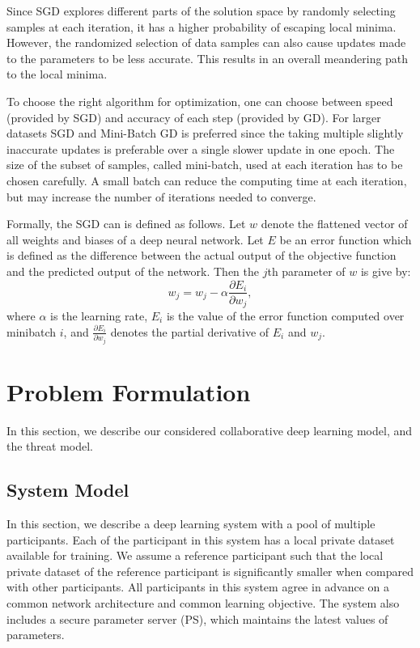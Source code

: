 \documentclass[conference]{IEEEtran}
\begin{document}
Since SGD explores different parts of the solution space by randomly selecting samples at each iteration, it has a higher probability of escaping local minima. However, the randomized selection of data samples can also cause updates made to the parameters to be less accurate. This results in an overall meandering path to the local minima. 

To choose the right algorithm for optimization, one can choose between speed (provided by SGD) and accuracy of each step (provided by GD). For larger datasets SGD and Mini-Batch GD is preferred since the taking multiple slightly inaccurate updates is preferable over a single slower update in one epoch.
The size of the subset of samples, called mini-batch, used at each iteration has to be chosen carefully. A small batch can reduce the
computing time at each iteration, but may increase the number of iterations needed to converge. 


Formally, the SGD can is defined as follows. 
Let $w$ denote the flattened
vector of all weights and biases of a deep neural
network. Let $E$ be an error function which is defined as the difference between the actual output of the objective function and the
predicted output of the network. 
Then the $j$th parameter of $w$ is give by:
 $$w_j = w_j -\alpha \frac{\partial E_i}{\partial w_j}, $$
where $\alpha$ is the learning rate,  $E_i$ is the value of the error function computed over minibatch $i$, and  
$\frac{\partial E_i}{\partial w_j}$ denotes the partial derivative of $E_i$ and $w_j$. 
 

\section{Problem Formulation}
In this section, we describe our considered collaborative deep learning model, and the threat model. 

\subsection{System Model} \label{sec:systemModel}
In this section, we describe a deep learning system with a pool of multiple participants. Each of the participant in this system has a
local private dataset available for training. We assume a reference participant such that the local private dataset of the reference
participant is significantly smaller when compared with other participants. All participants in this system agree in advance on a
common network architecture and common learning objective. The system also includes a secure parameter server (PS), which maintains the
latest values of parameters. 
\end{document}
